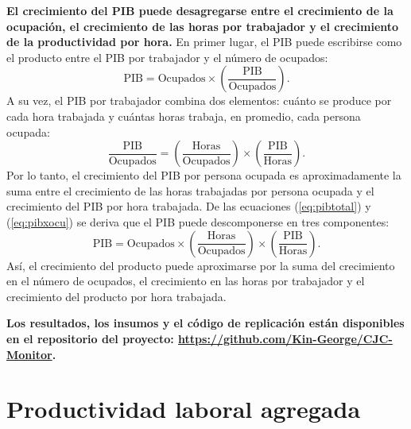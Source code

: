 \textbf{El crecimiento del PIB puede desagregarse entre el crecimiento de la ocupación, el crecimiento de las horas por trabajador y el crecimiento de la productividad por hora.} En primer lugar, el PIB puede escribirse como el producto entre el PIB por trabajador y el número de ocupados:
\begin{equation}\label{eq:pibtotal}
\text{PIB} = \text{Ocupados}\times
\left(\frac{\text{PIB}}{\text{Ocupados}}\right).    
\end{equation}
A su vez, el PIB por trabajador combina dos elementos: cuánto se produce por cada hora trabajada y cuántas horas trabaja, en promedio, cada persona ocupada:
\begin{equation}\label{eq:pibxocu}
\frac{\text{PIB}}{\text{Ocupados}} =
\left(\frac{\text{Horas}}{\text{Ocupados}}\right)
\times
\left(\frac{\text{PIB}}{\text{Horas}}\right).    
\end{equation}
Por lo tanto, el crecimiento del PIB por persona ocupada es aproximadamente la suma entre el crecimiento de las horas trabajadas por persona ocupada y el crecimiento del PIB por hora trabajada. De las ecuaciones (\ref{eq:pibtotal}) y (\ref{eq:pibxocu}) se deriva que el PIB puede descomponerse en tres componentes:
\begin{equation}
\text{PIB} = \text{Ocupados} \times \left(\frac{\text{Horas}}{\text{Ocupados}}\right) \times \left(\frac{\text{PIB}}{\text{Horas}}\right).    
\end{equation}
Así, el crecimiento del producto puede aproximarse por la suma del crecimiento en el número de ocupados, el crecimiento en las horas por trabajador y el crecimiento del producto por hora trabajada. %

\textbf{Los resultados, los insumos y el código de replicación están disponibles en el repositorio del proyecto: \url{https://github.com/Kin-George/CJC-Monitor}.}

\section{Productividad laboral agregada}

